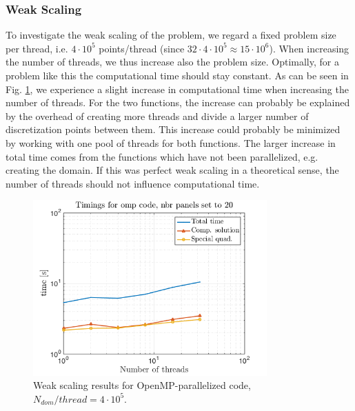 \documentclass[a4paper,10pt]{article}
\begin{document}
\subsubsection*{Weak Scaling}
To investigate the weak scaling of the problem, we regard a fixed problem size per thread, i.e. $4\cdot10^5$ points/thread (since $32\cdot4\cdot10^5 \approx 15\cdot 10^{6}$). When increasing the number of threads, we thus increase also the problem size. Optimally, for a problem like this the computational time should stay constant. As can be seen in Fig. \ref{fig:omp_weaktime}, we experience a slight increase in computational time when increasing the number of threads. For the two functions, the increase can probably be explained by the overhead of creating more threads and divide a larger number of discretization points between them. This increase could probably be minimized by working with one pool of threads for both functions.  The larger increase in total time comes from the functions which have not been parallelized, e.g. creating the domain. If this was perfect weak scaling in a theoretical sense, the number of threads should not influence computational time.
\begin{figure}[ht]
    \begin{center}
        \includegraphics[width=0.8\textwidth]{Graphics/omp_fixed_pntsPerThread_size_loglog.png}
    \end{center}
    \caption{Weak scaling results for OpenMP-parallelized code, $N_{dom}/thread=4\cdot 10^5$.}
    \label{fig:omp_weaktime}
\end{figure}

\FloatBarrier
\end{document}
